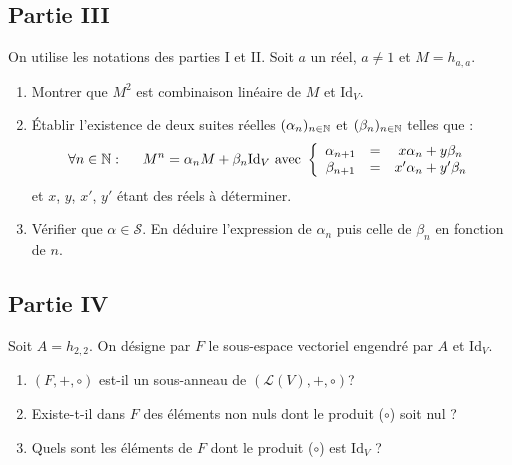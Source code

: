 \subsection*{Partie III}
On utilise les notations des parties I et II. Soit $a$ un réel, $a\neq 1$ et $M=h_{a,a}$.
\begin{enumerate}
\item Montrer que $M^2$ est combinaison linéaire de $M$ et $\mathrm{Id}_V$.
\item \'Etablir l'existence de deux suites réelles $(\alpha_n)_{n\in\mathbb{N}}$ et $(\beta_n)_{n\in\mathbb{N}}$ telles que :
\begin{displaymath}
\forall n \in \mathbb{N}:\hspace{0.5cm}  M^n=\alpha _n M + \beta _n \mathrm{Id}_V
\text{ avec }
\left\lbrace 
\begin{array}{ccc}
 \alpha_{n+1} &=& x \alpha_n + y\beta_n  \\ 
 \beta_{n+1}  &=& x'\alpha_n + y'\beta_n 
\end{array}
\right. 
\end{displaymath}
et $x$, $y$, $x'$, $y'$ étant des réels à déterminer.
\item Vérifier que $\alpha \in \mathcal S$. En déduire l'expression de $\alpha_n$ puis celle de $\beta_n$ en fonction de $n$.
\end{enumerate}

\subsection*{Partie IV}
Soit $A=h_{2,2}$. On désigne par $F$ le sous-espace vectoriel engendré par $A$ et $\mathrm{Id}_V$.
\begin{enumerate}
\item $(F,+,\circ)$ est-il un sous-anneau de $(\mathcal{L}(V),+,\circ )$?
\item Existe-t-il dans $F$ des éléments non nuls dont le produit ($\circ$) soit nul ?
\item Quels sont les éléments de $F$ dont le produit ($\circ$)  est $\mathrm{Id}_V$ ?
\end{enumerate}

